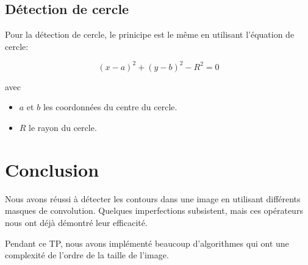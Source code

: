 \documentclass[11pt]{article}
\begin{document}
	\subsection{Détection de cercle}

	Pour la détection de cercle, le prinicipe est le même en utilisant l'équation de cercle:

	$$ (x-a)^2 + (y-b)^2 - R^2 = 0$$

	avec
	\begin{itemize}
	\item $a$ et $b$ les coordonnées du centre du cercle.
	\item $R$ le rayon du cercle.
	\end{itemize}

\section{Conclusion}

	Nous avons réussi à détecter les contours dans une image en utilisant différents masques de convolution. 
	Quelques imperfections subsistent, mais ces opérateurs nous ont déjà démontré leur efficacité. 

	Pendant ce TP, nous avons implémenté beaucoup d’algorithmes qui ont une complexité de l’ordre de la taille de l’image. 
\end{document}

